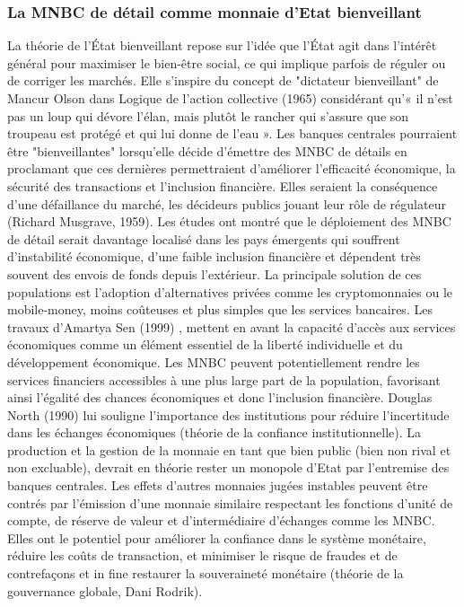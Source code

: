 \documentclass[12pt]{article}
\begin{document}
\subsubsection{La MNBC de détail comme monnaie d'Etat bienveillant}

La théorie de l'État bienveillant repose sur l'idée que l'État agit dans l'intérêt général pour maximiser le bien-être social, ce qui implique parfois de réguler ou de corriger les marchés. Elle s'inspire du concept de "dictateur bienveillant" de Mancur Olson dans Logique de l'action collective (1965) considérant qu'« il n'est pas un loup qui dévore l'élan, mais plutôt le rancher qui s'assure que son troupeau est protégé et qui lui donne de l'eau ». Les banques centrales pourraient être "bienveillantes" lorsqu'elle décide d'émettre des MNBC de détails en proclamant que ces dernières permettraient d'améliorer l'efficacité économique, la sécurité des transactions et l'inclusion financière. Elles seraient la conséquence  d'une défaillance du marché, les décideurs publics jouant leur rôle de régulateur (Richard Musgrave, 1959). Les études ont montré que le déploiement des MNBC de détail serait davantage localisé dans les pays émergents qui souffrent d'instabilité économique, d'une faible inclusion financière et dépendent très souvent des envois de fonds depuis l'extérieur. La principale solution de ces populations est l'adoption d'alternatives privées comme les cryptomonnaies ou le mobile-money, moins coûteuses et plus simples que les services bancaires. Les travaux d'Amartya Sen (1999) \cite{sen_development_1999}, mettent en avant la capacité d'accès aux services économiques comme un élément essentiel de la liberté individuelle et du développement économique. Les MNBC peuvent potentiellement rendre les services financiers accessibles à une plus large part de la population, favorisant ainsi l'égalité des chances économiques et donc l'inclusion financière. Douglas North (1990) \cite{north_institutions_1990} lui souligne l'importance des institutions pour réduire l'incertitude dans les échanges économiques (théorie de la confiance institutionnelle). La production et la gestion de la monnaie en tant que bien public (bien non rival et non excluable), devrait en théorie rester un monopole d'Etat par l'entremise des banques centrales. Les effets d'autres monnaies jugées instables peuvent être contrés par l'émission d'une monnaie similaire respectant les fonctions d'unité de compte, de réserve de valeur et d'intermédiaire d'échanges comme les MNBC. Elles ont le potentiel pour améliorer la confiance dans le système monétaire, réduire les coûts de transaction, et minimiser le risque de fraudes et de contrefaçons et in fine restaurer la souveraineté monétaire (théorie de la gouvernance globale, Dani Rodrik). \\
\end{document}
